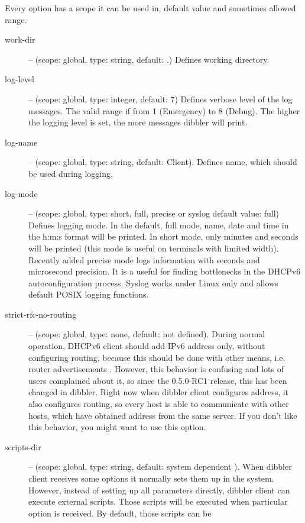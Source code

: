 Every option has a scope it can be used in, default value and
sometimes allowed range. 

\begin{description}
 \item[work-dir] -- (scope: global, type: string, default: .) Defines working
	    directory.
 \item[log-level] -- (scope: global, type: integer, default: 7) Defines
	    verbose level of the log messages. The valid range if
	    from 1 (Emergency) to 8 (Debug). The higher the logging
	    level is set, the more messages dibbler will print.
 \item[log-name] -- (scope: global, type: string, default: Client). Defines 
	    name, which should be used during logging.
 \item[log-mode] -- (scope: global, type: short, full, precise or syslog
	    default value: full) Defines logging mode. In the
	    default, full mode, name, date and time in the h:m:s format
	    will be printed. In short mode, only minutes and
	    seconds will be printed (this mode is useful on
	    terminals with limited width). Recently added precise
	    mode logs information with seconds and microsecond
	    precision. It is a useful for finding bottlenecks in
	    the DHCPv6 autoconfiguration process. Syslog works under 
	    Linux only and allows default POSIX logging functions.
 \item[strict-rfc-no-routing] -- (scope: global, type: none, default:
	    not defined). During normal operation, DHCPv6 client
	    should add IPv6 address only, without configuring
	    routing, because this should be done with other means,
	    i.e. router advertisements \cite{rfc2461}. However,
	    this behavior is confusing and lots of users complained
	    about it, so since the 0.5.0-RC1 release, this has been changed
	    in dibbler. Right now when dibbler client configures
	    address, it also configures routing, so every host is
	    able to communicate with other hosts, which have
	    obtained address from the same server. If you don't
	    like this behavior, you might want to use this option.
\item[scripts-dir] -- (scope: global, type: string, default: system
            dependent ). When
            dibbler client receives some options it normally sets them
            up in the system. However, instead of setting up all
            parameters directly, dibbler client can execute external
            scripts. Those scripts will be executed when particular
            option is received. By default, those scripts can be

\end{description}
